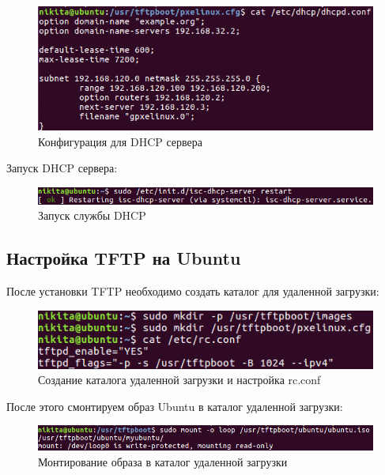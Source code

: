 \documentclass[14pt,a4paper,report]{report}
\begin{document}
\begin{figure}[h!]
	\centering
	\includegraphics[scale = 0.87]{images/2_2.png}
	\caption{Конфигурация для DHCP сервера}
	\label{image:6}
\end{figure}

Запуск DHCP сервера:

\begin{figure}[h!]
	\centering
	\includegraphics[scale = 1.0]{images/2_1.png}
	\caption{Запуск службы DHCP}
	\label{image:7}
\end{figure}

\subsection{Настройка TFTP на Ubuntu}

После установки TFTP необходимо создать каталог для удаленной загрузки:

\begin{figure}[h!]
	\centering
	\includegraphics[scale = 1.1]{images/2_3.png}
	\caption{Создание каталога удаленной загрузки и настройка rc.conf}
	\label{image:8}
\end{figure}

После этого смонтируем образ Ubuntu в каталог удаленной загрузки:

\begin{figure}[h!]
	\centering
	\includegraphics[scale = 0.8]{images/2_4.png}
	\caption{Монтирование образа в каталог удаленной загрузки}
	\label{image:9}
\end{figure}
\end{document}

